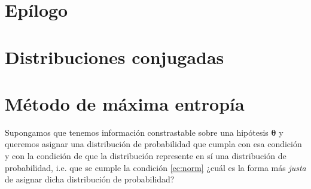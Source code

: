 \documentclass[a4paper,twoside]{article}
\newcommand{\hip}{\ensuremath{\mathbold{\theta}}\xspace}
\begin{document}

\section{Epílogo}

\appendix

\section{Distribuciones conjugadas}\label{sc:conjugate-pdf}


\section{Método de máxima entropía}\label{sc:me-method}

Supongamos que tenemos información constrastable sobre una hipótesis \(\hip\) y queremos asignar una
distribución de probabilidad que cumpla con esa condición y con la condición de que la distribución
represente en sí una distribución de probabilidad, i.e. que se cumple la condición \eqref{ec:norm}
¿cuál es la forma más \emph{justa} de asignar dicha distribución de probabilidad?
\end{document}
